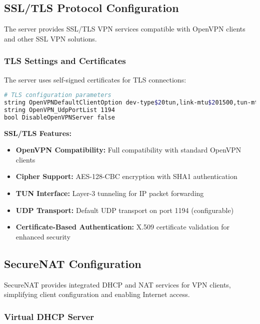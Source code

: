 \subsection{SSL/TLS Protocol Configuration}

The server provides SSL/TLS VPN services compatible with OpenVPN clients and other SSL VPN solutions.

\subsubsection{TLS Settings and Certificates}

The server uses self-signed certificates for TLS connections:

\begin{lstlisting}[language=bash]
# TLS configuration parameters
string OpenVPNDefaultClientOption dev-type$20tun,link-mtu$201500,tun-mtu$201500,cipher$20AES-128-CBC,auth$20SHA1,keysize$20128,key-method$202,tls-client
string OpenVPN_UdpPortList 1194
bool DisableOpenVPNServer false
\end{lstlisting}

\textbf{SSL/TLS Features:}

\begin{itemize}
    \item \textbf{OpenVPN Compatibility:} Full compatibility with standard OpenVPN clients
    \item \textbf{Cipher Support:} AES-128-CBC encryption with SHA1 authentication
    \item \textbf{TUN Interface:} Layer-3 tunneling for IP packet forwarding
    \item \textbf{UDP Transport:} Default UDP transport on port 1194 (configurable)
    \item \textbf{Certificate-Based Authentication:} X.509 certificate validation for enhanced security
\end{itemize}

\subsection{SecureNAT Configuration}

SecureNAT provides integrated DHCP and NAT services for VPN clients, simplifying client configuration and enabling Internet access.

\subsubsection{Virtual DHCP Server}

